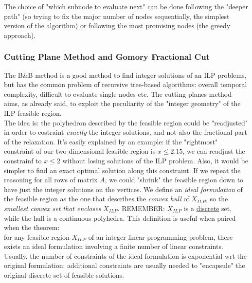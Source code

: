 \documentclass{article}
\begin{document}
					The choice of "which subnode to evaluate next" can be done following the "deeper path" (so trying to fix the major number of nodes sequentially, the simplest version of the algorithm) or following the most promising nodes (the greedy approach). 

			\subsubsection{Cutting Plane Method and Gomory Fractional Cut}
				The B\&B method is a good method to find integer solutions of an ILP problems, but has the common problem of recursive tree-based algorithms: overall temporal complexity, difficult to evaluate single nodes etc. The cutting planes method aims, as already said, to exploit the peculiarity of the "integer geometry" of the ILP feasible region.\\
				The idea is: the polyhedron described by the feasible region could be "readjusted" in order to costraint \textit{exactly} the integer solutions, and not also the fractional part of the relaxation. It's easily explained by an example: if the "rightmost" constraint of our two-dimensional feasible region is $x \leq 2.15$, we can readjust the constrainf to $x \leq 2$ without losing solutions of the ILP problem. Also, it would be simpler to find an exact optimal solution along this constraint. If we repeat the reasoning for all rows of matrix $A$, we could "shrink" the feasible region down to have just the integer solutions on the vertices. We define an \textit{ideal formulation} of the feasible region as the one that describes the \textit{convex hull} of $X_{ILP}$, so the \textit{smallest convex set that encloses} $X_{ILP}$. REMEMBER: $X_{ILP}$ is a \underline{discrete} set, while the hull is a continuous polyhedra. This definition is useful when paired when the theorem:\\
				for any feasible region $X_{ILP}$ of an integer linear programming problem, there exists an ideal formulation involving a finite number of linear constraints.\\
				Usually, the number of constraints of the ideal formulation is exponential wrt the original formulation: additional constraints are usually needed to "encapsule" the original discrete set of feasible solutions.
\end{document}
